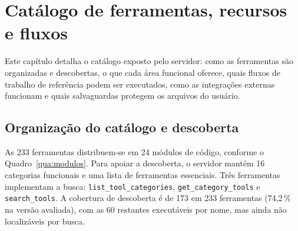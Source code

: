 \chapter{Catálogo de ferramentas, recursos e fluxos}\label{cap:catalogo}

Este capítulo detalha o catálogo exposto pelo servidor: como as ferramentas
são organizadas e descobertas, o que cada área funcional oferece, quais fluxos
de trabalho de referência podem ser executados, como as integrações externas
funcionam e quais salvaguardas protegem os arquivos do usuário.

\section{Organização do catálogo e descoberta}

As 233 ferramentas distribuem-se em 24 módulos de código, conforme o
Quadro~\ref{qua:modulos}. Para apoiar a descoberta, o servidor mantém 16
categorias funcionais e uma lista de ferramentas essenciais. Três ferramentas
implementam a busca: \texttt{list\_tool\_categories},
\texttt{get\_category\_tools} e \texttt{search\_tools}. A cobertura de
descoberta é de 173 em 233 ferramentas (74,2\,\% na versão avaliada), com as
60 restantes executáveis por nome, mas ainda não localizáveis por busca.

